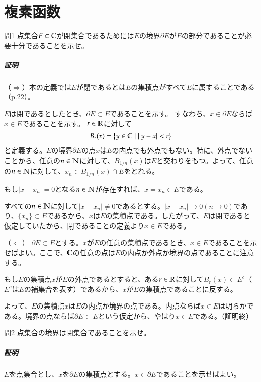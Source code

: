 \chapter{複素函数}%

\begin{mysimplebox}{問1}
    点集合$E\subset\mathbb{C}$が閉集合であるためには$E$の境界$\partial E$が$E$の部分であることが必要十分であることを示せ。 
\end{mysimplebox}
\paragraph{証明}
（$\Rightarrow$）本の定義では$E$が閉であるとは$E$の集積点がすべて$E$に属することである（p.22）。

$E$は閉であるとしたとき、$\partial E\subset E$であることを示す。
すなわち、$x\in\partial E$ならば$x\in E$であることを示す。
$r\in\mathbb{R}$に対して
\begin{align*}
    B_r(x)=\left\{y\in\mathbb{C}\mid\|y-x|<r\right\}
\end{align*}
と定義する。$E$の境界$\partial E$の点$x$は$E$の内点でも外点でもない。特に、外点でないことから、任意の$n\in \mathbb{N}$に対して、$B_{1/n}(x)$は$E$と交わりをもつ。よって、任意の$n\in \mathbb{N}$に対して、$x_n\in B_{1/n}(x)\cap E$をとれる。

もし$|x-x_n|=0$となる$n\in\mathbb{N}$が存在すれば、$x=x_n\in E$である。

すべての$n\in\mathbb{N}$に対して$|x-x_n|\neq 0$であるとする。$|x-x_n|\longrightarrow 0 (n\longrightarrow 0)$であり、$\{x_n\}\subset E$であるから、$x$は$E$の集積点である。したがって、$E$は閉であると仮定していたから、閉であることの定義より$x\in E$である。

（$\Leftarrow$）
$\partial E\subset E$とする。$x$が$E$の任意の集積点であるとき、$x\in E$であることを示せばよい。ここで、$\mathbb{C}$の任意の点は$E$の内点か外点か境界の点であることに注意する。

もし$E$の集積点$x$が$E$の外点であるとすると、ある$r\in\mathbb{R}$に対して$B_r(x)\subset E^c$（$E^c$は$E$の補集合を表す）であるから、$x$が$E$の集積点であることに反する。

よって、$E$の集積点$x$は$E$の内点か境界の点である。内点ならば$x\in E$は明らかである。境界の点ならば$\partial E\subset E$という仮定から、やはり$x\in E$である。（証明終）

\begin{mysimplebox}{問2}
    点集合の境界は閉集合であることを示せ。 
\end{mysimplebox}
\paragraph{証明}
$E$を点集合とし、$x$を$\partial E$の集積点とする。$x\in\partial E$であることを示せばよい。

